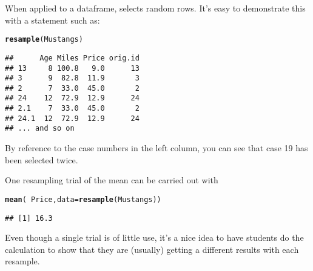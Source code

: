 \documentclass[11pt]{article}\usepackage[]{graphicx}\usepackage[]{color}
\makeatletter
\newcommand{\hlopt}[1]{\textcolor[rgb]{0,0,0}{#1}}%
\newcommand{\hlstd}[1]{\textcolor[rgb]{0.345,0.345,0.345}{#1}}%
\newcommand{\hlkwc}[1]{\textcolor[rgb]{0.333,0.667,0.333}{#1}}%
\newcommand{\hlkwd}[1]{\textcolor[rgb]{0.737,0.353,0.396}{\textbf{#1}}}%
\newenvironment{kframe}{%
 \def\at@end@of@kframe{}%
 \ifinner\ifhmode%
  \def\at@end@of@kframe{\end{minipage}}%
  \begin{minipage}{\columnwidth}%
 \fi\fi%
 \def\FrameCommand##1{\hskip\@totalleftmargin \hskip-\fboxsep
 \colorbox{shadecolor}{##1}\hskip-\fboxsep
     \hskip-\linewidth \hskip-\@totalleftmargin \hskip\columnwidth}%
 \MakeFramed {\advance\hsize-\width
   \@totalleftmargin\z@ \linewidth\hsize
   \@setminipage}}%
 {\par\unskip\endMakeFramed%
 \at@end@of@kframe}
\newenvironment{knitrout}{}{} %
\makeatother
\begin{document}
When applied to a dataframe,  selects random rows.  It's easy to demonstrate this with a statement such as:

\begin{knitrout}
\color{fgcolor}\begin{kframe}
\begin{alltt}
\hlkwd{resample}\hlstd{(Mustangs)}
\end{alltt}
\end{kframe}
\end{knitrout}
\begin{knitrout}
\color{fgcolor}\begin{kframe}
\begin{verbatim}
##      Age Miles Price orig.id
## 13     8 100.8   9.0      13
## 3      9  82.8  11.9       3
## 2      7  33.0  45.0       2
## 24    12  72.9  12.9      24
## 2.1    7  33.0  45.0       2
## 24.1  12  72.9  12.9      24
## ... and so on
\end{verbatim}
\end{kframe}
\end{knitrout}

By reference to the case numbers in the left column, you can see that case 19 has been selected twice.

One resampling trial of the mean can be carried out with
\begin{knitrout}
\color{fgcolor}\begin{kframe}
\begin{alltt}
\hlkwd{mean}\hlstd{(}\hlopt{~} \hlstd{Price,} \hlkwc{data} \hlstd{=} \hlkwd{resample}\hlstd{(Mustangs))}
\end{alltt}
\begin{verbatim}
## [1] 16.3
\end{verbatim}
\end{kframe}
\end{knitrout}
Even though a single trial is of little use, it's a nice idea to have
students do the calculation to show that they are 
(usually) getting a different results with each resample.
  
\end{document}
